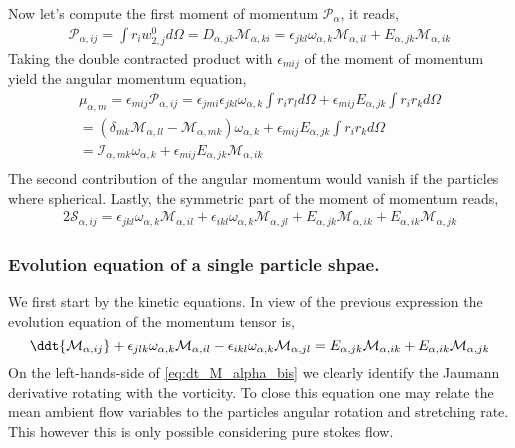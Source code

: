 Now let's compute the first moment of momentum $\mathcal{P}_\alpha$, it reads, 
\begin{align*}
    \mathcal{P}_{\alpha,ij}
    = \int r_i w_{2,j}^0 d\Omega
    = D_{\alpha,jk} \mathcal{M}_{\alpha,ki}
    = \epsilon_{jkl} \omega_{\alpha,k} \mathcal{M}_{\alpha,il}
    +  E_{\alpha,jk} \mathcal{M}_{\alpha,ik}
\end{align*}
Taking the double contracted product with $\epsilon_{mij}$ of the moment of momentum yield the angular momentum equation, 
\begin{align*}
    \mu_{\alpha,m}
    = \epsilon_{mij}\mathcal{P}_{\alpha,ij}
    = \epsilon_{jmi} \epsilon_{jkl} \omega_{\alpha,k} \int r_i r_l  d\Omega
    +  \epsilon_{mij} E_{\alpha,jk} \int r_i r_k  d\Omega\\
    = (\delta_{mk}\mathcal{M}_{\alpha,ll} - \mathcal{M}_{\alpha,mk}) \omega_{\alpha,k}
    +  \epsilon_{mij} E_{\alpha,jk} \int r_i r_k  d\Omega\\
    = \mathcal{I}_{\alpha,mk} \omega_{\alpha,k}
    +  \epsilon_{mij} E_{\alpha,jk} \mathcal{M}_{\alpha,ik}\\
\end{align*}
The second contribution of the angular momentum would vanish if the particles where spherical. 
Lastly, the symmetric part of the moment of momentum reads, 
\begin{align*}
    2\mathcal{S}_{\alpha,ij}
    = \epsilon_{jkl} \omega_{\alpha,k} \mathcal{M}_{\alpha,il}
    + \epsilon_{ikl} \omega_{\alpha,k} \mathcal{M}_{\alpha,jl}
    +  E_{\alpha,jk} \mathcal{M}_{\alpha,ik}
    +  E_{\alpha,ik}  \mathcal{M}_{\alpha,jk}
\end{align*}

\subsubsection*{Evolution equation of a single particle shpae.}

We first start by the kinetic equations.  
In view of the previous expression the evolution equation of the momentum tensor is,  
\begin{equation*}
    \ddt {\mathcal{M}_{\alpha,ij}}
    + \epsilon_{jlk} \omega_{\alpha,k} \mathcal{M}_{\alpha,il}
    - \epsilon_{ikl} \omega_{\alpha,k} \mathcal{M}_{\alpha,jl}
     =  E_{\alpha,jk} \mathcal{M}_{\alpha,ik}
     +  E_{\alpha,ik}  \mathcal{M}_{\alpha,jk}
     \label{eq:dt_M_alpha_bis}
\end{equation*}
On the left-hands-side of \ref{eq:dt_M_alpha_bis} we clearly identify the Jaumann derivative rotating with the vorticity.
To close this equation one may relate the mean ambient flow variables to the particles angular rotation and stretching rate. 
This however this is only possible considering pure stokes flow.

